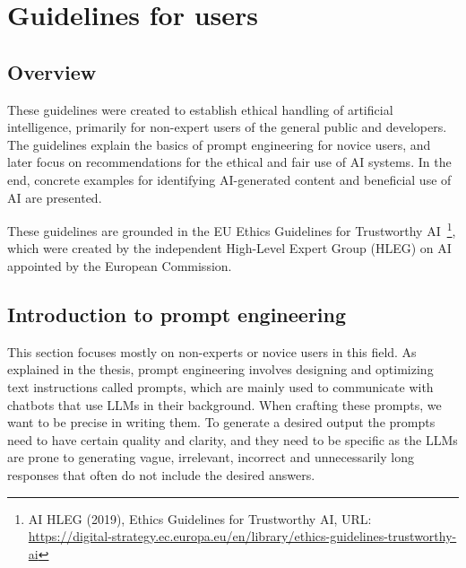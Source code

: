\setcounter{figure}{0}
\setcounter{table}{0}
\setcounter{section}{0}
\setcounter{listing}{0}

\chapter{Guidelines for users \label{cha:guidelines}}
\renewcommand{\thepage}{B-\arabic{page}}


\minitoc
\clearpage

\section{Overview}
These guidelines were created to establish ethical handling of artificial intelligence, primarily for non-expert users of the general public and developers. The guidelines explain the basics of prompt engineering for novice users, and later focus on recommendations for the ethical and fair use of AI systems. In the end, concrete examples for identifying AI-generated content and beneficial use of AI are presented.

These guidelines are grounded in the EU Ethics Guidelines for Trustworthy AI~\footnote{AI HLEG (2019), Ethics Guidelines for Trustworthy AI, URL: \url{https://digital-strategy.ec.europa.eu/en/library/ethics-guidelines-trustworthy-ai}}, which were created by the independent High-Level Expert Group (HLEG) on AI appointed by the European Commission.

\section{Introduction to prompt engineering}
This section focuses mostly on non-experts or novice users in this field. As explained in the thesis, prompt engineering involves designing and optimizing text instructions called prompts, which are mainly used to communicate with chatbots that use LLMs in their background. When crafting these prompts, we want to be precise in writing them. To generate a desired output the prompts need to have certain quality and clarity, and they need to be specific as the LLMs are prone to generating vague, irrelevant, incorrect and unnecessarily long responses that often do not include the desired answers.

